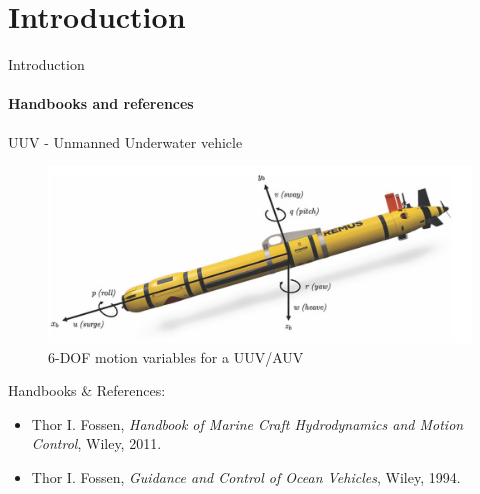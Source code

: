 \section{Introduction}




\begin{frame}{Introduction}
	\framesubtitle{Handbooks and references}
	UUV - Unmanned Underwater vehicle
	\begin{figure}
		\centering
		\includegraphics[width=0.75\linewidth]{img/6DOF motion AUV}
		\caption{6-DOF motion variables for a UUV/AUV}
		\label{fig: UUV}
	\end{figure}
	
	Handbooks \& References:
	\begin{itemize}
		\item Thor I. Fossen, \textit{Handbook of Marine Craft Hydrodynamics and Motion Control}, Wiley, 2011.
		\item Thor I. Fossen, \textit{Guidance and Control of Ocean Vehicles}, Wiley, 1994.
	\end{itemize}
	
\end{frame}





